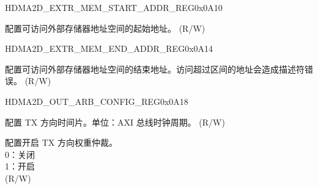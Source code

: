 \begin{register}{H}{DMA2D\_EXTR\_MEM\_START\_ADDR\_REG}{0x0A10}\label{regdesc:DMA2DEXTRMEMSTARTADDRREG}
%
\regnewline%
\begin{regdesc}\begin{reglist}
\label{fielddesc:DMA2DACCESSEXTRMEMSTARTADDR}\item [DMA2D\_ACCESS\_EXTR\_MEM\_START\_ADDR] 配置可访问外部存储器地址空间的起始地址。 (R/W)
\end{reglist}\end{regdesc}
\end{register}


\begin{register}{H}{DMA2D\_EXTR\_MEM\_END\_ADDR\_REG}{0x0A14}\label{regdesc:DMA2DEXTRMEMENDADDRREG}
%
\regnewline%
\begin{regdesc}\begin{reglist}
\label{fielddesc:DMA2DACCESSEXTRMEMENDADDR}\item [DMA2D\_ACCESS\_EXTR\_MEM\_END\_ADDR] 配置可访问外部存储器地址空间的结束地址。访问超过区间的地址会造成描述符错误。 (R/W)
\end{reglist}\end{regdesc}
\end{register}


\begin{register}{H}{DMA2D\_OUT\_ARB\_CONFIG\_REG}{0x0A18}\label{regdesc:DMA2DOUTARBCONFIGREG}
%
%
%
\regnewline%
\begin{regdesc}\begin{reglist}
\label{fielddesc:DMA2DOUTARBTIMEOUTNUM}\item [DMA2D\_OUT\_ARB\_TIMEOUT\_NUM] 配置 TX 方向时间片。单位：AXI 总线时钟周期。 (R/W)
\label{fielddesc:DMA2DOUTWEIGHTEN}\item [DMA2D\_OUT\_WEIGHT\_EN] 配置开启 TX 方向权重仲裁。\\
0：关闭\\
1：开启\\ (R/W)
\end{reglist}\end{regdesc}
\end{register}


